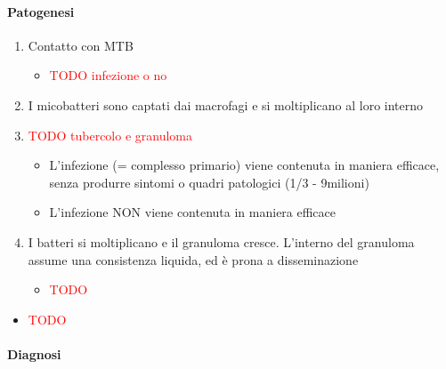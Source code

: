 \documentclass[italian,]{article}
\providecommand{\tightlist}{%
  \setlength{\itemsep}{0pt}\setlength{\parskip}{0pt}}
\newcommand{\TODO}[1]{\textcolor{red}{\textsf{\footnotesize{TODO #1}}}} %
\begin{document}
\hypertarget{patogenesi-3}{%
\paragraph{Patogenesi}\label{patogenesi-3}}

\begin{enumerate}
\def\labelenumi{\arabic{enumi}.}
\setcounter{enumi}{-1}
\item
  Contatto con MTB

  \begin{itemize}
  \item
    \TODO{infezione o no}
  \end{itemize}
\item
  I micobatteri sono captati dai macrofagi e si moltiplicano al loro
  interno
\item
  \TODO{tubercolo e granuloma}

  \begin{itemize}
  \tightlist
  \item
    L'infezione (= complesso primario) viene contenuta in maniera
    efficace, senza produrre sintomi o quadri patologici (1/3 -
    9milioni)
  \item
    L'infezione NON viene contenuta in maniera efficace
  \end{itemize}
\item
  I batteri si moltiplicano e il granuloma cresce. L'interno del
  granuloma assume una consistenza liquida, ed è prona a disseminazione

  \begin{itemize}
  \item
    \TODO{}
  \end{itemize}
\end{enumerate}

\begin{itemize}
\item
  \TODO{}
\end{itemize}

\hypertarget{diagnosi-3}{%
\paragraph{Diagnosi}\label{diagnosi-3}}
\end{document}
